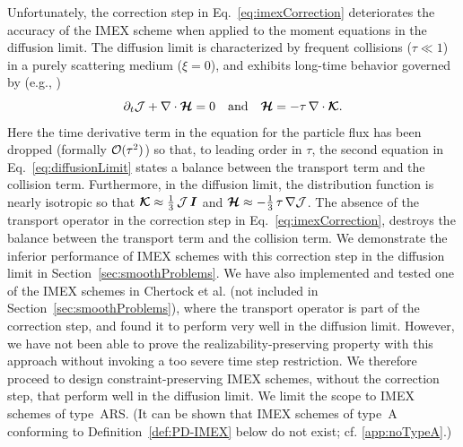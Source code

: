 Unfortunately, the correction step in Eq.~\eqref{eq:imexCorrection} deteriorates the accuracy of the IMEX scheme when applied to the moment equations in the diffusion limit.  
The diffusion limit is characterized by frequent collisions ($\tau\ll 1$) in a purely scattering medium ($\xi=0$), and exhibits long-time behavior governed by (e.g., \cite{jinLevermore_1996})
\begin{equation}
  \partial_{t}{\mathcal{J}} + \nabla\cdot\boldsymbol{\mathcal{H}} = 0
  \quad\text{and}\quad
  \boldsymbol{\mathcal{H}} = - \tau\,\nabla\cdot\boldsymbol{\mathcal{K}}.  
  \label{eq:diffusionLimit}
\end{equation}
Here the time derivative term in the equation for the particle flux has been dropped (formally $\mathcal{O}(\tau^{2})$) so that, to leading order in $\tau$, the second equation in Eq.~\eqref{eq:diffusionLimit} states a balance between the transport term and the collision term.  
Furthermore, in the diffusion limit, the distribution function is nearly isotropic so that $\boldsymbol{\mathcal{K}}\approx\frac{1}{3}\,\mathcal{J}\,\boldsymbol{I}$ and $\boldsymbol{\mathcal{H}}\approx-\frac{1}{3}\,\tau\,\nabla\mathcal{J}$.  
The absence of the transport operator in the correction step in Eq.~\eqref{eq:imexCorrection}, destroys the balance between the transport term and the collision term.  
We demonstrate the inferior performance of IMEX schemes with this correction step in the diffusion limit in Section~\ref{sec:smoothProblems}.  
We have also implemented and tested one of the IMEX schemes in Chertock et al. \cite{chertock_etal_2015} (not included in Section~\ref{sec:smoothProblems}), where the transport operator is part of the correction step, and found it to perform very well in the diffusion limit.  
However, we have not been able to prove the realizability-preserving property with this approach without invoking a too severe time step restriction.  
We therefore proceed to design constraint-preserving IMEX schemes, without the correction step, that perform well in the diffusion limit.  
We limit the scope to IMEX schemes of type~ARS.  
(It can be shown that IMEX schemes of type~A conforming to Definition~\ref{def:PD-IMEX} below do not exist; cf. \ref{app:noTypeA}.)

